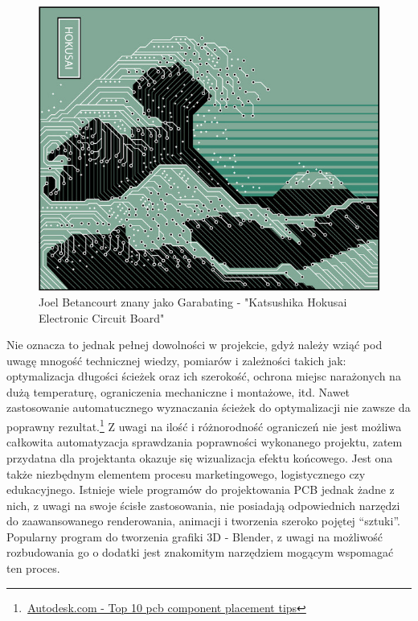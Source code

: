 \documentclass[brudnopis]{xmgr}
\begin{document}
\begin{figure}[!tbh]
\centering
\includegraphics[width=0.9\hsize]{fig/hokusai}
\caption{Joel Betancourt znany jako Garabating - "Katsushika Hokusai Electronic Circuit Board"\label{RYS.1}}
\end{figure}

Nie oznacza to jednak pełnej dowolności w projekcie, gdyż należy wziąć pod uwagę mnogość technicznej wiedzy, pomiarów i zależności takich jak: optymalizacja długości ścieżek oraz ich szerokość, ochrona miejsc narażonych na dużą temperaturę, ograniczenia mechaniczne i montażowe, itd. Nawet zastosowanie automatucznego wyznaczania ścieżek do optymalizacji nie zawsze da poprawny rezultat.\footnote{\,\href{https://www.autodesk.com/products/eagle/blog/top-10-pcb-component-placement-tips-pcb-beginner/}{Autodesk.com - Top 10 pcb component placement tips}} Z uwagi na ilość i różnorodność ograniczeń nie jest możliwa całkowita automatyzacja sprawdzania poprawności wykonanego projektu, zatem przydatna dla projektanta okazuje się wizualizacja efektu końcowego. Jest ona także niezbędnym elementem procesu marketingowego, logistycznego czy edukacyjnego. Istnieje wiele programów do projektowania PCB jednak żadne z nich, z uwagi na swoje ścisłe zastosowania, nie posiadają odpowiednich narzędzi do zaawansowanego renderowania, animacji i tworzenia szeroko pojętej “sztuki”. Popularny program do tworzenia grafiki 3D - Blender, z uwagi na możliwość rozbudowania go o dodatki jest znakomitym narzędziem mogącym wspomagać ten proces.
\end{document}

